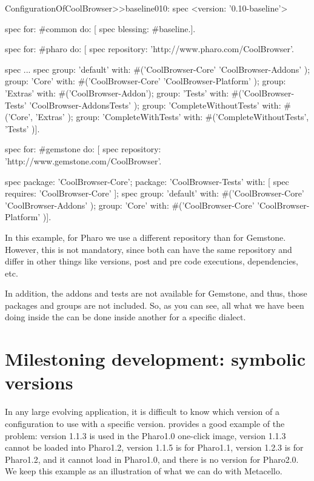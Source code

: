\documentclass[a4paper,10pt,twoside]{book}
\begin{document}
  \begin{code}{}
 ConfigurationOfCoolBrowser>>baseline010: spec
       <version: '0.10-baseline'>

       spec for: #common do: [
              spec blessing: #baseline.].

       spec for: #pharo do: [
              spec repository: 'http://www.pharo.com/CoolBrowser'.

              spec
                     ...
              spec
                     group: 'default' with: #('CoolBrowser-Core' 'CoolBrowser-Addons' );
                     group: 'Core' with: #('CoolBrowser-Core' 'CoolBrowser-Platform' );
                     group: 'Extras' with: #('CoolBrowser-Addon');
                     group: 'Tests' with: #('CoolBrowser-Tests' 'CoolBrowser-AddonsTests' );
                     group: 'CompleteWithoutTests' with: #('Core', 'Extras' );
                     group: 'CompleteWithTests' with: #('CompleteWithoutTests', 'Tests' )].

       spec for: #gemstone do: [
              spec repository: 'http://www.gemstone.com/CoolBrowser'.

              spec
                     package: 'CoolBrowser-Core';
                     package: 'CoolBrowser-Tests' with: [ spec requires: 'CoolBrowser-Core' ];
              spec
                     group: 'default' with: #('CoolBrowser-Core' 'CoolBrowser-Addons' );
                     group: 'Core' with: #('CoolBrowser-Core' 'CoolBrowser-Platform' )].

\end{code}

In this example, for Pharo we use a different repository than for Gemstone. However, this is not mandatory, since both can have the same repository and differ in other things like versions, post and pre code executions, dependencies, etc.

In addition, the addons and tests are not available for Gemstone, and thus, those packages and groups are not included. So, as you can see, all what we have been doing inside the  can be done inside another  for a specific dialect.


\section{Milestoning development: symbolic versions}
In any large evolving application, it is difficult to know which version of a configuration to use with a specific version.
 provides a good example of the problem: version 1.1.3 is used in the Pharo1.0 one-click image,  version 1.1.3 cannot be loaded into Pharo1.2, version 1.1.5 is for Pharo1.1, version 1.2.3 is for Pharo1.2, and it cannot load in Pharo1.0, and there is no version for Pharo2.0. We keep this example as an illustration of what we can do with Metacello.
\end{document}
